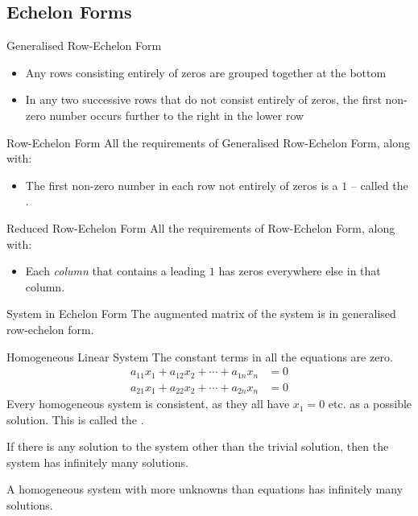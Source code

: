 \documentclass[\main/notes.tex]{subfiles}
\begin{document}
			\subsection{Echelon Forms}
				\begin{definition}{Generalised Row-Echelon Form}
					\begin{itemize}
						\item Any rows consisting entirely of zeros are grouped together at the bottom
						\item In any two successive rows that do not consist entirely of zeros, the first non-zero number occurs further to the right in the lower row
					\end{itemize}
				\end{definition}
				\begin{definition}{Row-Echelon Form}
					All the requirements of Generalised Row-Echelon Form, along with:
					\begin{itemize}[nosep]
						\item The first non-zero number in each row not entirely of zeros is a $1$ -- called the .
					\end{itemize}
				\end{definition}
				\begin{definition}{Reduced Row-Echelon Form}
					All the requirements of Row-Echelon Form, along with:
					\begin{itemize}
						\item Each \emph{column} that contains a leading $1$ has zeros everywhere else in that column.
					\end{itemize}
				\end{definition}
				\begin{definition}{System in Echelon Form}
					The augmented matrix of the system is in generalised row-echelon form.
				\end{definition}
				\begin{definition}{Homogeneous Linear System}
					The constant terms in all the equations are zero.
					\begin{align*}
						a_{11}x_{1} + a_{12}x_{2} + \cdots + a_{1n}x_{n} &= 0\\
						a_{21}x_{1} + a_{22}x_{2} + \cdots + a_{2n}x_{n} &= 0
					\end{align*}
					Every homogeneous system is consistent, as they all have $x_{1} = 0$ etc. as a possible solution. This is called the .

					If there is any solution to the system other than the trivial solution, then the system has infinitely many solutions.

					A homogeneous system with more unknowns than equations has infinitely many solutions.
				\end{definition}
\end{document}
